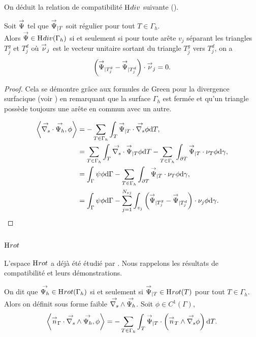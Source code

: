On déduit la relation de compatibilité \(\mathrm{H}_\mathrm{{}}{div}\) suivante (\cite[Lemme.~8]{nedelec_mixed_1980}).
\begin{prop}
    \label{prop:annex:hdiv_hrot:hdiv}
    Soit \({\overset{\rightarrow}{\Psi}}\) tel que \({\overset{\rightarrow}{\Psi}}_{|T}\) soit régulier pour tout \(T\in\Gamma_h\).\\
    Alors \({\overset{\rightarrow}{\Psi}} \in \mathrm{H}_\mathrm{{}}{div}(\Gamma_h)\) si et seulement si pour toute arête \(v_j\) séparant les triangles \(T_j^g\) et \(T_j^d\) où \({\overset{\rightarrow}{\nu}}_j\) est le vecteur unitaire sortant du triangle \(T_j^g\) vers \(T_j^d\), on a
    \begin{equation*}
        \left( {\overset{\rightarrow}{\Psi}}_{|T_j^g} - {\overset{\rightarrow}{\Psi}}_{|T_j^d} \right ) \cdot {\overset{\rightarrow}{\nu}}_j = 0.
    \end{equation*}
\end{prop}

\begin{proof}
    Cela se démontre grâce aux formules de Green pour la divergence surfacique (voir \cite[eq.~(A3.47)]{bladel_electromagnetic_2007}) en remarquant que la surface \(\Gamma_h\) est fermée et qu'un triangle possède toujours une arête en commun avec un autre.

    \begin{align*}
    \left< {\overset{\rightarrow}{\nabla_s}} \cdot {\overset{\rightarrow}{\Psi_h}}, \phi \right>
    & = - \sum_{T\in\Gamma_h} \int_T {\overset{\rightarrow}{\Psi}}_{|T} \cdot {\overset{\rightarrow}{\nabla_s}} \phi\mathrm{d}{T}, \\
    & = \sum_{T\in\Gamma_h} \int_T {\overset{\rightarrow}{\nabla_s}} \cdot {\overset{\rightarrow}{\Psi}}_{|T} \phi \mathrm{d}{T} - \sum_{T\in\Gamma_h} \int_{\partial T} {\overset{\rightarrow}{\Psi}}_{|T} \cdot \nu_T \phi \mathrm{d}{\gamma}, \\
    & = \int_\Gamma \psi \phi \mathrm{d}{\Gamma} - \sum_{T\in\Gamma_h} \int_{\partial T} {\overset{\rightarrow}{\Psi}}_{|T} \cdot \nu_T \phi \mathrm{d}{\gamma}, \\
    & = \int_\Gamma \psi \phi \mathrm{d}{\Gamma} - \sum_{j=1}^{N_{vj}} \int_{v_j} \left( {\overset{\rightarrow}{\Psi}}_{|T_j^g} - {\overset{\rightarrow}{\Psi}}_{|T_j^d} \right) \cdot \nu_j \phi \mathrm{d}{\gamma}.
    \end{align*}
\end{proof}

\subsection[Hrot]{\(\mathrm{H}_\mathrm{{}}{rot}\)}

L'espace \(\mathrm{H}_\mathrm{{}}{rot}\) a déjà été étudié par \cite[Lemme.~ 6]{nedelec_mixed_1980}. Nous rappelons les résultats de compatibilité et leurs démonstrations.

\begin{defn}
    On dit que \({\overset{\rightarrow}{\Psi_h}} \in \mathrm{H}_\mathrm{{}}{rot}(\Gamma_h)\) si et seulement si \({\overset{\rightarrow}{\Psi}}_{|T} \in \mathrm{H}_\mathrm{{}}{rot}(T)\) pour tout \(T \in \Gamma_h\).\\
    Alors on définit sous forme faible \({\overset{\rightarrow}{\nabla_s}} \wedge {\overset{\rightarrow}{\Psi_h}} \).
    Soit \(\phi \in C^1(\Gamma)\),
    \begin{equation*}
        \left< \vn_\Gamma \cdot \vrots \vect{\Psi_h}, \phi \right> %
        = - \sum_{T\in\Gamma_h} \int_T \vect{\Psi}_{|T}  \cdot \left( \vn_T \pvect \vgrads \phi \right) \dd{T}.
    \end{equation*}
\end{defn}

